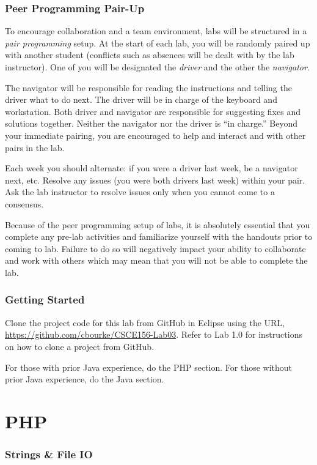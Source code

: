 \documentclass[12pt]{scrartcl}
\begin{document}
\section*{Peer Programming Pair-Up}

To encourage collaboration and a team environment, labs will be
structured in a \emph{pair programming} setup.  At the start of
each lab, you will be randomly paired up with another student 
(conflicts such as absences will be dealt with by the lab instructor).
One of you will be designated the \emph{driver} and the other
the \emph{navigator}.  

The navigator will be responsible for reading the instructions and
telling the driver what to do next.  The driver will be in charge of the
keyboard and workstation.  Both driver and navigator are responsible
for suggesting fixes and solutions together.  Neither the navigator
nor the driver is ``in charge.''  Beyond your immediate pairing, you
are encouraged to help and interact and with other pairs in the lab.

Each week you should alternate: if you were a driver last week, 
be a navigator next, etc.  Resolve any issues (you were both drivers
last week) within your pair.  Ask the lab instructor to resolve issues
only when you cannot come to a consensus.  

Because of the peer programming setup of labs, it is absolutely 
essential that you complete any pre-lab activities and familiarize
yourself with the handouts prior to coming to lab.  Failure to do
so will negatively impact your ability to collaborate and work with 
others which may mean that you will not be able to complete the
lab.  

\section*{Getting Started}

Clone the project code for this lab from GitHub in Eclipse using the
URL, \url{https://github.com/cbourke/CSCE156-Lab03}.
Refer to Lab 1.0 for instructions on how to clone a project from GitHub.

For those with prior Java experience, do the PHP section.  For those
without prior Java experience, do the Java section.

\part*{PHP}

\section*{Strings \& File IO}
\end{document}
